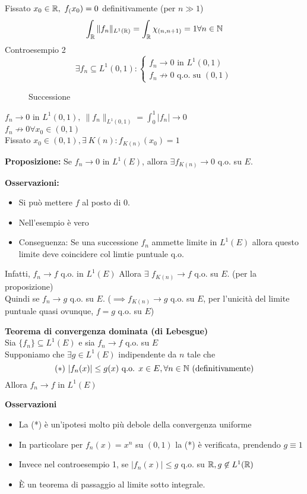 Fissato $x_0\in\mathbb{R},\ f_(x_0)=0$ definitivamente (per $n\gg 1$)
\[\int_{\mathbb{R}}^{} \|f_n\|_{L^1(\mathbb{R})}=\int_{\mathbb{R}}^{} \chi_{(n,n+1)}=1 \forall n\in\mathbb{N}\]
Controesempio 2
\[\exists f_n \subseteq L^1(0,1): \begin{cases}
	f_n\to 0 \text{ in }L^1(0,1)\\
	f_n \not\to 0\text{ q.o. su }(0,1)
\end{cases} 
\]
\begin{figure}[ht]
    \centering
    \caption{Successione}
    \label{fig:disegno}
\end{figure}
$f_n\to 0$ in $L^1(0,1), \ \|f_n\|_{L^1(0,1)}=\int_{0}^{1} |f_n|\to 0 $
\\$f_n\not\to 0\forall x_0\in(0,1)$
\\Fissato $x_0\in(0,1), \exists\  K(n):f_{K(n)}(x_0)=1$ 
\begin{tcolorbox}
	\textbf{Proposizione:} Se $f_n\to 0$ in $L^1(E)$, allora $\exists f_{K(n)}\to 0$ q.o. su $E$.
\end{tcolorbox}
\textbf{Osservazioni:} 
\begin{itemize}
	\item Si può mettere $f$ al posto di 0.
	\item Nell'esempio è vero
	\item Conseguenza: Se una successione $f_n$ ammette limite in $L^1(E)$ allora questo limite deve coincidere col limtie puntuale q.o. 
\end{itemize}
Infatti, $f_n\to f$ q.o. in $L^{1}(E)$
Allora $\exists $ $f_{K(n)}  \to f$ q.o. su $E$. (per la proposizione)
\\Quindi se $f_n\to g$ q.o. su $E$. ($\implies f_{K(n)}\to g$ q.o. su $E$, per l'unicità del limite puntuale quasi ovunque, $f=g$ q.o. su $E$)
\begin{tcolorbox}
	\textbf{Teorema di convergenza dominata (di Lebesgue)}
	\\Sia $\{f_n\} \subseteq  L^1(E)$ e sia $f_n\to f$ q.o. su $E$\\
	Supponiamo che $\exists g\in L^1(E)$ indipendente da $n$ tale che
	\[(*)\ |f_n(x)|\le g(x)\text{ q.o. }x\in E, \forall n \in \mathbb{N}\text{ (definitivamente)}\]
	Allora $f_n\to f$ in $L^1(E)$
\end{tcolorbox}
\textbf{Osservazioni}
\begin{itemize}
	\item La (*) è un'ipotesi molto più debole della convergenza uniforme
	\item In particolare per $f_n(x)=x^n$ su $(0,1)$ la (*) è verificata, prendendo $g\equiv 1$
	\item Invece nel controesempio 1, se $|f_n(x)|\le g$ q.o. su $\mathbb{R},g \not\in L^1(\mathbb{R})$
	\item È un teorema di passaggio al limite sotto integrale.
\end{itemize}

